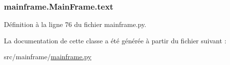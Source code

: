 \hypertarget{classmainframe_1_1_main_frame_af1af1736f4265c359d01ed94192f5be2}{}
\subsubsection[{text}]{\setlength{\rightskip}{0pt plus 5cm}mainframe.\+Main\+Frame.\+text}\label{classmainframe_1_1_main_frame_af1af1736f4265c359d01ed94192f5be2}


Définition à la ligne 76 du fichier mainframe.\+py.



La documentation de cette classe a été générée à partir du fichier suivant \+:\begin{DoxyCompactItemize}
\item 
src/mainframe/\hyperlink{mainframe_8py}{mainframe.\+py}\end{DoxyCompactItemize}
